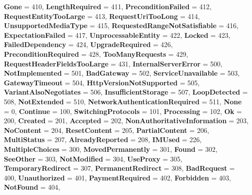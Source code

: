 \begin{DoxyCompactItemize}
{\bfseries Gone} = 410, 
{\bfseries Length\+Required} = 411, 
\newline
{\bfseries Precondition\+Failed} = 412, 
{\bfseries Request\+Entity\+Too\+Large} = 413, 
{\bfseries Request\+Uri\+Too\+Long} = 414, 
{\bfseries Unsupported\+Media\+Type} = 415, 
\newline
{\bfseries Requested\+Range\+Not\+Satisfiable} = 416, 
{\bfseries Expectation\+Failed} = 417, 
{\bfseries Unprocessable\+Entity} = 422, 
{\bfseries Locked} = 423, 
\newline
{\bfseries Failed\+Dependency} = 424, 
{\bfseries Upgrade\+Required} = 426, 
{\bfseries Precondition\+Required} = 428, 
{\bfseries Too\+Many\+Requests} = 429, 
\newline
{\bfseries Request\+Header\+Fields\+Too\+Large} = 431, 
{\bfseries Internal\+Server\+Error} = 500, 
{\bfseries Not\+Implemented} = 501, 
{\bfseries Bad\+Gateway} = 502, 
\newline
{\bfseries Service\+Unavailable} = 503, 
{\bfseries Gateway\+Timeout} = 504, 
{\bfseries Http\+Version\+Not\+Supported} = 505, 
{\bfseries Variant\+Also\+Negotiates} = 506, 
\newline
{\bfseries Insufficient\+Storage} = 507, 
{\bfseries Loop\+Detected} = 508, 
{\bfseries Not\+Extended} = 510, 
{\bfseries Network\+Authentication\+Required} = 511, 
\newline
{\bfseries None} = 0, 
{\bfseries Continue} = 100, 
{\bfseries Switching\+Protocols} = 101, 
{\bfseries Processing} = 102, 
\newline
{\bfseries Ok} = 200, 
{\bfseries Created} = 201, 
{\bfseries Accepted} = 202, 
{\bfseries Non\+Authoritative\+Information} = 203, 
\newline
{\bfseries No\+Content} = 204, 
{\bfseries Reset\+Content} = 205, 
{\bfseries Partial\+Content} = 206, 
{\bfseries Multi\+Status} = 207, 
\newline
{\bfseries Already\+Reported} = 208, 
{\bfseries I\+M\+Used} = 226, 
{\bfseries Multiple\+Choices} = 300, 
{\bfseries Moved\+Permanently} = 301, 
\newline
{\bfseries Found} = 302, 
{\bfseries See\+Other} = 303, 
{\bfseries Not\+Modified} = 304, 
{\bfseries Use\+Proxy} = 305, 
\newline
{\bfseries Temporary\+Redirect} = 307, 
{\bfseries Permanent\+Redirect} = 308, 
{\bfseries Bad\+Request} = 400, 
{\bfseries Unauthorized} = 401, 
\newline
{\bfseries Payment\+Required} = 402, 
{\bfseries Forbidden} = 403, 
{\bfseries Not\+Found} = 404, 

\end{DoxyCompactItemize}
